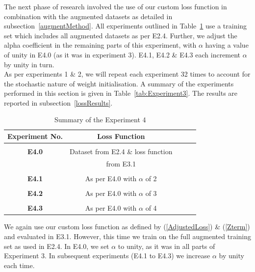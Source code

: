 \noindent
The next phase of research involved the use of our custom loss function in combination with the augmented datasets as detailed in subsection~\ref{augmentMethod}. All experiments outlined in Table~\ref{tab:Experiment4} use a training set which includes all augmented datasets as per E2.4. Further, we adjust the alpha coefficient in the remaining parts of this experiment, with $\alpha$ having a value of unity in E4.0 (as it was in experiment 3). E4.1, E4.2 \& E4.3 each increment $\alpha$ by unity in turn.
\\

\noindent
As per experiments 1 \& 2, we will repeat each experiment 32 times to account for the stochastic nature of weight initialisation. A summary of the experiments performed in this section is given in Table~\ref{tab:Experiment3}. The results are reported in subsection~\ref{lossResults}.

\begin{table}[h!]
	 \begin{center}
		
		\begin{tabular}{c|c|c|r|c} %
			\textbf{Experiment No.} & \textbf{Loss Function}  \\
			
			\hline
			& \\
			
			\textbf{E4.0} & Dataset from E2.4 \& loss function  \\
			& from E3.1 \\
			& \\
			\textbf{E4.1} & As per E4.0 with $\alpha$ of 2  \\  
			
			& \\
			\textbf{E4.2} & As per E4.0 with $\alpha$ of 3 \\  
			
			& \\
			\textbf{E4.3} & As per E4.0 with $\alpha$ of 4 \\
			
		\end{tabular}
		\caption{Summary of the Experiment 4} {We again use our custom loss function as defined by (\ref{AdjustedLoss}) \& (\ref{Zterm}) and evaluated in E3.1. However, this time we train on the full augmented training set as used in E2.4. In E4.0, we set $\alpha$ to unity, as it was in all parts of Experiment 3. In subsequent experiments (E4.1 to E4.3) we increase $\alpha$ by unity each time.}
		\label{tab:Experiment4}
		 \end{center}
\end{table}


